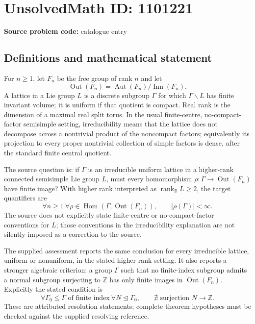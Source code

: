 \documentclass[11pt]{article}
\newcommand{\Z}{\mathbb{Z}}
\newcommand{\R}{\mathbb{R}}
\begin{document}
\section*{UnsolvedMath ID: 1101221}
\textbf{Source problem code:} catalogue entry
\subsection{Definitions and mathematical statement}
For $n\geq1$, let $F_n$ be the free group of rank $n$ and let
\[
 \operatorname{Out}(F_n)=\operatorname{Aut}(F_n)/\operatorname{Inn}(F_n).
\]
A lattice in a Lie group $L$ is a discrete subgroup $\Gamma$ for which $\Gamma\backslash L$ has finite invariant volume; it is uniform if that quotient is compact. Real rank is the dimension of a maximal real split torus. In the usual finite-centre, no-compact-factor semisimple setting, irreducibility means that the lattice does not decompose across a nontrivial product of the noncompact factors; equivalently its projection to every proper nontrivial collection of simple factors is dense, after the standard finite central quotient.

The source question is: if $\Gamma$ is an irreducible uniform lattice in a higher-rank connected semisimple Lie group $L$, must every homomorphism $\rho:\Gamma\to\operatorname{Out}(F_n)$ have finite image? With higher rank interpreted as $\operatorname{rank}_{\R}L\geq2$, the target quantifiers are
\[
 \forall n\geq1\ \forall\rho\in\operatorname{Hom}(\Gamma,\operatorname{Out}(F_n)),
 \qquad |\rho(\Gamma)|<\infty.
\]
The source does not explicitly state finite-centre or no-compact-factor conventions for $L$; those conventions in the irreducibility explanation are not silently imposed as a correction to the source.

The supplied assessment reports the same conclusion for every irreducible lattice, uniform or nonuniform, in the stated higher-rank setting. It also reports a stronger algebraic criterion: a group $\Gamma$ such that no finite-index subgroup admits a normal subgroup surjecting to $\Z$ has only finite images in $\operatorname{Out}(F_n)$. Explicitly the stated condition is
\[
 \forall\Gamma_0\leq\Gamma\text{ of finite index}\ \forall N\trianglelefteq\Gamma_0,
 \qquad \nexists\text{ surjection }N\longrightarrow\Z.
\]
These are attributed resolution statements; complete theorem hypotheses must be checked against the supplied resolving reference.
\end{document}
